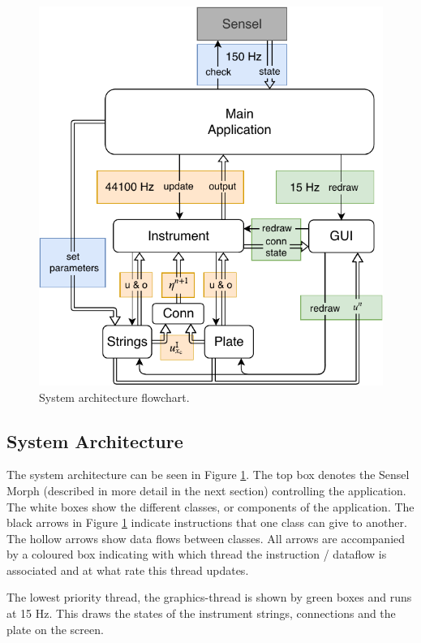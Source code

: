 \documentclass{article}
\begin{document}
\begin{figure}[h]
\centering
\includegraphics[width=1.0\columnwidth]{JUCE.pdf}
\caption{System architecture flowchart. \label{fig:flowchart}}
\end{figure}

\subsection{System Architecture}
The system architecture can be seen in Figure \ref{fig:flowchart}. The top box denotes the Sensel Morph (described in more detail in the next section) controlling the application. The white boxes show the different classes, or components of the application. The black arrows in Figure \ref{fig:flowchart} indicate instructions that one class can give to another. The hollow arrows show data flows between classes. All arrows are accompanied by a coloured box indicating with which thread the instruction / dataflow is associated and at what rate this thread updates.

The lowest priority thread, the graphics-thread is shown by green boxes and runs at 15 Hz. This draws the states of the instrument strings, connections and the plate on the screen.
\end{document}
